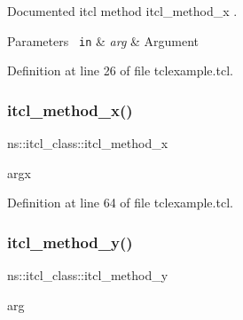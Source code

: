 Documented itcl method {\ttfamily itcl\+\_\+method\+\_\+x} . 


\begin{DoxyParams}[1]{Parameters}
\mbox{\texttt{ in}}  & {\em arg} & Argument \\
\hline
\end{DoxyParams}


Definition at line 26 of file tclexample.\+tcl.


\begin{DoxyCode}{0}

\end{DoxyCode}
\mbox{\label{classns_1_1itcl__class_aad1f81467f2fca0dc02e527e786513a4}} 
\subsubsection{\texorpdfstring{itcl\_method\_x()}{itcl\_method\_x()}\hspace{0.1cm}{\footnotesize\ttfamily [2/2]}}
{\footnotesize\ttfamily ns\+::itcl\+\_\+class\+::itcl\+\_\+method\+\_\+x\begin{DoxyParamCaption}\item[{}]{argx  }\end{DoxyParamCaption}}



Definition at line 64 of file tclexample.\+tcl.


\begin{DoxyCode}{0}

\end{DoxyCode}
\mbox{\label{classns_1_1itcl__class_a092d0f8ed4796902e41fbeb1dfed82f1}} 
\subsubsection{\texorpdfstring{itcl\_method\_y()}{itcl\_method\_y()}}
{\footnotesize\ttfamily ns\+::itcl\+\_\+class\+::itcl\+\_\+method\+\_\+y\begin{DoxyParamCaption}\item[{}]{arg  }\end{DoxyParamCaption}}



